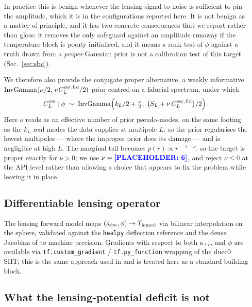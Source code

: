 \documentclass[twocolumn,superscriptaddress,aps,prl,floatfix]{revtex4-2}
\newcommand{\alm}{a_{\ell m}}
\newcommand{\clpp}{C_L^{\phi\phi}}
\newcommand{\placeholder}[1]{\textcolor{blue}{\textbf{[PLACEHOLDER: #1]}}}
\begin{document}
In practice this is benign whenever the lensing signal-to-noise is sufficient
to pin the amplitude, which it is in the configurations reported here. It is
not benign as a matter of principle, and it has two concrete consequences that
we report rather than gloss: it removes the only safeguard against an
amplitude runaway if the temperature block is poorly initialised, and it means
a rank test of $\phi$ against a truth drawn from a \emph{proper} Gaussian prior
is not a calibration test of this target (Sec.~\ref{sec:sbc}).

We therefore also provide the conjugate proper alternative, a weakly
informative $\mathrm{InvGamma}(\nu/2,\, \nu C_L^{\phi\phi,\,\rm fid}/2)$ prior centred on
a fiducial spectrum, under which
\begin{equation}
  \clpp \mid \phi \;\sim\; \mathrm{InvGamma}\!\left(k_L/2 + \tfrac{\nu}{2},\;
  \big(S_L + \nu\,C_L^{\phi\phi,\,\rm fid}\big)/2\right).
  \label{eq:block4-proper}
\end{equation}
Here $\nu$ reads as an effective number of prior pseudo-modes, on the same
footing as the $k_L$ real modes the data supplies at multipole $L$, so the
prior regularises the lowest multipoles --- where the improper prior does its
damage --- and is negligible at high $L$. The marginal tail becomes
$p(r) \propto r^{\,-1-\nu}$, so the target is proper exactly for $\nu > 0$; we
use $\nu = \placeholder{6}$, and reject $\nu \le 0$ at the API level rather
than allowing a choice that appears to fix the problem while leaving it in
place.

\subsection{Differentiable lensing operator}
\label{sec:lensing}

The lensing forward model maps $(\alm, \phi) \to T_{\rm lensed}$ via bilinear
interpolation on the sphere, validated against the \texttt{healpy} deflection
reference and the dense Jacobian of \citet{Reinecke:2023} to machine precision.
Gradients with respect to both $\alm$ and $\phi$ are available via
\texttt{tf.custom\_gradient} / \texttt{tf.py\_function} wrapping of the ducc0
SHT; this is the same approach used in \citet{Flinch} and is treated here
as a standard building block.

\subsection{What the lensing-potential deficit is not}
\label{sec:deficit-not}
\end{document}
